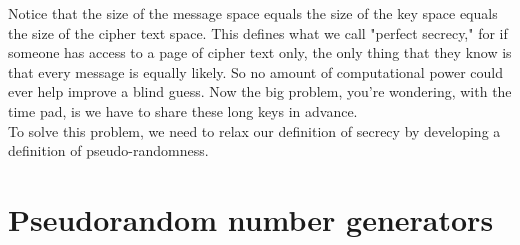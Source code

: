 \documentclass{report}
\begin{document}
Notice that the size of the message space equals the size of the key space equals the size of the cipher text space. This defines what we call "perfect secrecy," for if someone has access to a page of cipher text only, the only thing that they know is that every message is equally likely. So no amount of computational power could ever help improve a blind guess. Now the big problem, you're wondering, with the time pad, is we have to share these long keys in advance.\\
To solve this problem, we need to relax our definition of secrecy by developing a definition of pseudo-randomness. 

\section{Pseudorandom number generators}
\end{document}
